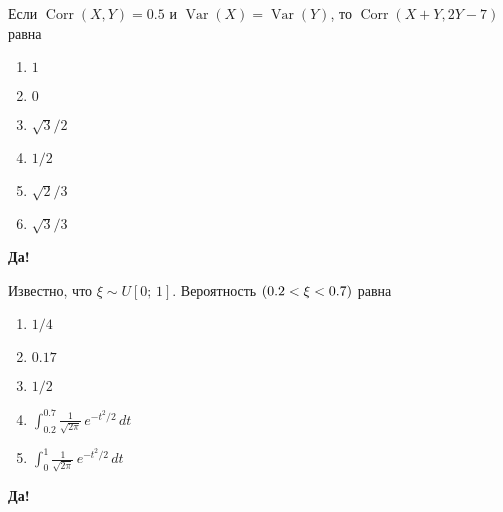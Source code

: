 \documentclass[t]{beamer}
\DeclareMathOperator{\Var}{Var}
\DeclareMathOperator{\Corr}{Corr}
\let\P\relax
\DeclareMathOperator{\P}{\mathbb{P}}
\begin{document}
 \begin{frame} \label{15-Yes} 
\begin{block}{15} 

  Если $\Corr(X, Y)= 0.5$ и $\Var(X)=\Var(Y)$, то $\Corr(X + Y, 2Y - 7)$ равна
  


 \end{block} 
\begin{enumerate} 
\item[] \hyperlink{15-No}{\beamergotobutton{} $1$}
\item[] \hyperlink{15-No}{\beamergotobutton{} $0$}
\item[] \hyperlink{15-Yes}{\beamergotobutton{} $\sqrt{3}/2$}
\item[] \hyperlink{15-No}{\beamergotobutton{} $1/2$}
\item[] \hyperlink{15-No}{\beamergotobutton{} $\sqrt{2}/3$}
\item[] \hyperlink{15-No}{\beamergotobutton{} $\sqrt{3}/3$}
\end{enumerate} 

 \textbf{Да!} 
 \hyperlink{16}{}\end{frame} 


 \begin{frame} \label{16-Yes} 
\begin{block}{16} 

  Известно, что $\xi \sim U[0;\,1]$. Вероятность $\P(0.2<\xi<0.7)$ равна
  


 \end{block} 
\begin{enumerate} 
\item[] \hyperlink{16-No}{\beamergotobutton{} $1/4$}
\item[] \hyperlink{16-No}{\beamergotobutton{} $0.17$}
\item[] \hyperlink{16-Yes}{\beamergotobutton{} $1/2$}
\item[] \hyperlink{16-No}{\beamergotobutton{} $\int_{0.2}^{0.7}\frac{1}{\sqrt{2\pi}}\,e^{-t^2/2}\,dt$}
\item[] \hyperlink{16-No}{\beamergotobutton{} $\int_{0}^{1}\frac{1}{\sqrt{2\pi}}\,e^{-t^2/2}\,dt$}
\end{enumerate} 

 \textbf{Да!} 
 \hyperlink{17}{}\end{frame} 
\end{document}
